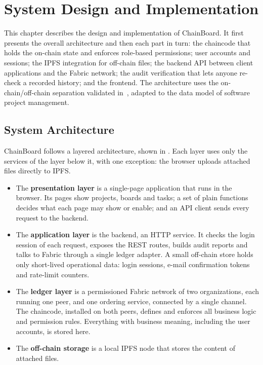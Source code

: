 \chapter{System Design and Implementation}
\label{ch:method}

This chapter describes the design and implementation of ChainBoard. It first presents the overall architecture and then each part in turn: the chaincode that holds the on-chain state and enforces role-based permissions; user accounts and sessions; the IPFS integration for off-chain files; the backend API between client applications and the Fabric network; the audit verification that lets anyone re-check a recorded history; and the frontend. The architecture uses the on-chain/off-chain separation validated in~\cite{adel2023}, adapted to the data model of software project management.

\section{System Architecture}
\label{sec:architecture}

ChainBoard follows a layered architecture, shown in . Each layer uses only the services of the layer below it, with one exception: the browser uploads attached files directly to IPFS.

\begin{itemize}
    \item The \textbf{presentation layer} is a single-page application that runs in the browser. Its pages show projects, boards and tasks; a set of plain functions decides what each page may show or enable; and an API client sends every request to the backend.
    \item The \textbf{application layer} is the backend, an HTTP service. It checks the login session of each request, exposes the REST routes, builds audit reports and talks to Fabric through a single ledger adapter. A small off-chain store holds only short-lived operational data: login sessions, e-mail confirmation tokens and rate-limit counters.
    \item The \textbf{ledger layer} is a permissioned Fabric network of two organizations, each running one peer, and one ordering service, connected by a single channel. The chaincode, installed on both peers, defines and enforces all business logic and permission rules. Everything with business meaning, including the user accounts, is stored here.
    \item The \textbf{off-chain storage} is a local IPFS node that stores the content of attached files.
\end{itemize}

